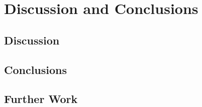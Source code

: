 \chapter{Discussion and Conclusions}

\section{Discussion}

\section{Conclusions}

\section{Further Work}